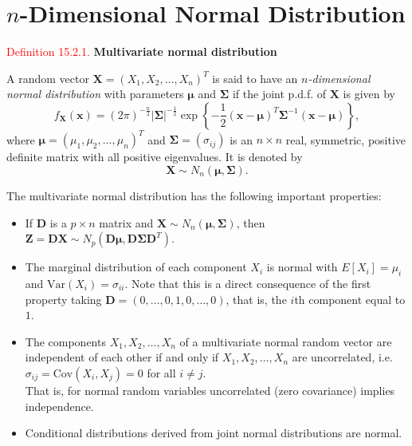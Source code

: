 \documentclass[
]{book}
\providecommand{\tightlist}{%
  \setlength{\itemsep}{0pt}\setlength{\parskip}{0pt}}
\begin{document}
\hypertarget{MV_Normal:multi}{%
\section{\texorpdfstring{\(n\)-Dimensional Normal Distribution}{n-Dimensional Normal Distribution}}\label{MV_Normal:multi}}

\leavevmode{}%
\textcolor{red}{Definition 15.2.1.}
{\textbf{Multivariate normal distribution}}

A random vector \(\mathbf{X} = (X_1,X_2,\dots,X_n)^T\) is said to have an \(\mathit{n}\)\emph{-dimensional normal distribution} with parameters \(\mathbf{\mu}\) and \(\mathbf{\Sigma}\) if the joint p.d.f. of \(\mathbf{X}\) is given by
\[ f_{\mathbf{X}}(\mathbf{x}) = (2\pi)^{-\frac{n}{2}} \left| \mathbf{\Sigma} \right|^{-\frac{1}{2}} \exp \left\{ -\frac{1}{2} (\mathbf{x}-\mathbf{\mu})^T \mathbf{\Sigma}^{-1} (\mathbf{x}-\mathbf{\mu}) \right\},\]
where \(\mathbf{\mu} = (\mu_1,\mu_2,\dots,\mu_n)^T\) and \(\mathbf{\Sigma} = (\sigma_{ij})\) is an \(n \times n\) real, symmetric, positive definite matrix with all positive eigenvalues. It is denoted by
\[\mathbf{X} \sim N_n(\mathbf{\mu},\mathbf{\Sigma}).\]

The multivariate normal distribution has the following important properties:

\begin{itemize}
\tightlist
\item
  If \(\mathbf{D}\) is a \(p \times n\) matrix and \(\mathbf{X} \sim N_n(\mathbf{\mu},\mathbf{\Sigma})\), then \(\mathbf{Z} = \mathbf{D}\mathbf{X} \sim N_p (\mathbf{D} \mathbf{\mu}, \mathbf{D} \mathbf{\Sigma} \mathbf{D}^T)\).\\
\item
  The marginal distribution of each component \(X_i\) is normal with \(E[X_i]=\mu_i\) and \(\text{Var}(X_i)=\sigma_{ii}\). Note that this is a direct consequence of the first property taking \(\mathbf{D}=(0,\dots,0,1,0,\dots,0)\), that is, the \(i\)th component equal to \(1\).\\
\item
  The components \(X_1,X_2,\dots,X_n\) of a multivariate normal random vector are independent of each other if and only if \(X_1, X_2,\ldots,X_n\) are uncorrelated, i.e.~\(\sigma_{ij} = \text{Cov}(X_i,X_j) = 0\) for all \(i \neq j\).\\
  That is, for normal random variables uncorrelated (zero covariance) implies independence.\\
\item
  Conditional distributions derived from joint normal distributions are normal.
\end{itemize}
\end{document}
